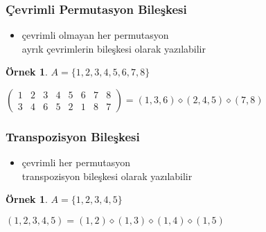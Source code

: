 \documentclass[dvipsnames]{beamer}
\theoremstyle{definition}
\theoremstyle{example}
\newtheorem{ornek}[theorem]{Örnek}
\theoremstyle{plain}
\begin{document}
\begin{frame}
  \frametitle{Çevrimli Permutasyon Bileşkesi}

  \begin{itemize}
    \item çevrimli olmayan her permutasyon\\
      ayrık çevrimlerin bileşkesi olarak yazılabilir
  \end{itemize}

  \pause
  \begin{ornek}
    $A = \{1,2,3,4,5,6,7,8\}$

    \medskip
    $\left(
      \begin{array}{cccccccc}
        1 & 2 & 3 & 4 & 5 & 6 & 7 & 8\\
        3 & 4 & 6 & 5 & 2 & 1 & 8 & 7
      \end{array}
    \right) = (1,3,6) \diamond (2,4,5) \diamond (7,8)$
  \end{ornek}
\end{frame}

\begin{frame}
  \frametitle{Transpozisyon Bileşkesi}

  \begin{itemize}
    \item çevrimli her permutasyon\\
      transpozisyon bileşkesi olarak yazılabilir
  \end{itemize}

  \pause
  \begin{ornek}
    $A = \{1,2,3,4,5\}$

    \medskip
    $(1,2,3,4,5) = (1,2) \diamond (1,3) \diamond (1,4) \diamond (1,5)$
  \end{ornek}
\end{frame}
\end{document}
